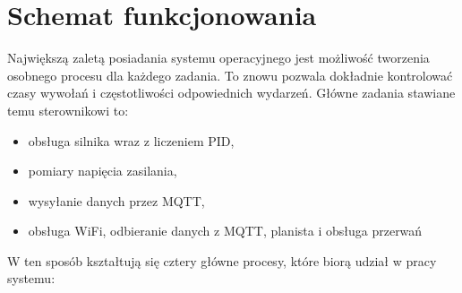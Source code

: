     
        \section{Schemat funkcjonowania}
            Największą zaletą posiadania systemu operacyjnego jest możliwość tworzenia osobnego procesu dla każdego zadania. To znowu pozwala dokładnie kontrolować czasy wywołań i częstotliwości odpowiednich wydarzeń. Główne zadania stawiane temu sterownikowi to:
            
            \begin{itemize}
                \item obsługa silnika wraz z liczeniem PID,
                \item pomiary napięcia zasilania,
                \item wysyłanie danych przez MQTT,
                \item obsługa WiFi, odbieranie danych z MQTT, planista i obsługa przerwań
            \end{itemize}
            
            W ten sposób kształtują się cztery główne procesy, które biorą udział w pracy systemu:
            
